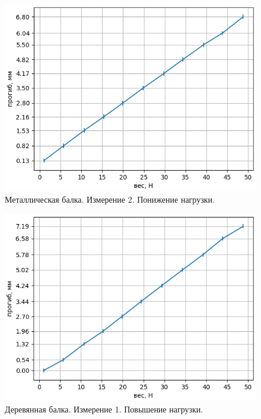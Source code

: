\documentclass{article}
\begin{document}
\begin{figure}
    \centering
    \includegraphics[width=0.9\linewidth]{металл 2 убыв.png}
    \caption{Металлическая балка. Измерение 2. Понижение нагрузки.}
    \label{fig:enter-label}
\end{figure}


\begin{figure}
    \centering
    \includegraphics[width=0.9\linewidth]{дерево 1 возраст.png}
    \caption{Деревянная балка. Измерение 1. Повышение нагрузки.}
    \label{fig:enter-label}
\end{figure}
\end{document}
